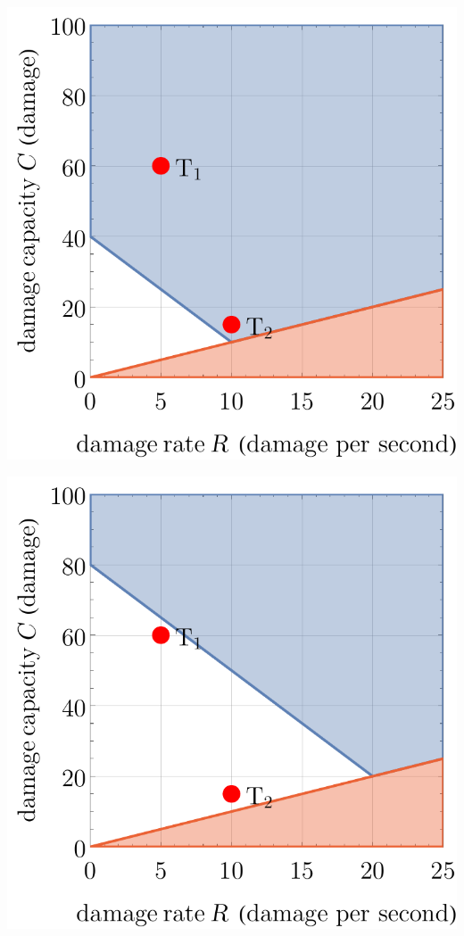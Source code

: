 \begin{center}
    \captionsetup{type=figure}
    \begin{minipage}{.33\textwidth}
        \centering
        \includegraphics[width=0.95\linewidth]{img/model3 base.pdf}
        \label{fig:model-3-base}
    \end{minipage}%
    \begin{minipage}{.33\textwidth}
        \centering
        \includegraphics[width=0.95\linewidth]{img/model3 h20.pdf}

\end{minipage}
\end{center}
